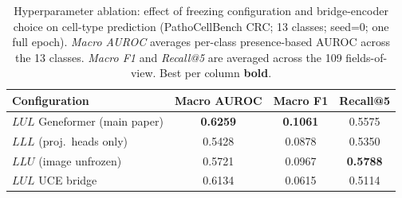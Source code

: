 \begin{table}[h]
    \centering
    \small
    \caption{Hyperparameter ablation: effect of freezing configuration
    and bridge-encoder choice on cell-type prediction (PathoCellBench
    CRC; 13 classes; seed=0; one full epoch). \emph{Macro AUROC}
    averages per-class presence-based AUROC across the 13 classes.
    \emph{Macro F1} and \emph{Recall@5} are averaged across the 109
    fields-of-view. Best per column \textbf{bold}.}
    \label{tab:freezing_encoder_appendix}
    \begin{tabular}{lccc}
        \toprule
        Configuration                       & Macro AUROC      & Macro F1 & Recall@5 \\
        \midrule
        $LUL$ Geneformer (main paper)       & \textbf{0.6259}  & \textbf{0.1061} & 0.5575 \\
        $LLL$ (proj.\ heads only)           & 0.5428           & 0.0878 & 0.5350 \\
        $LLU$ (image unfrozen)              & 0.5721           & 0.0967 & \textbf{0.5788} \\
        $LUL$ UCE bridge                    & 0.6134           & 0.0615 & 0.5114 \\
        \bottomrule
    \end{tabular}
\end{table}

%
%


